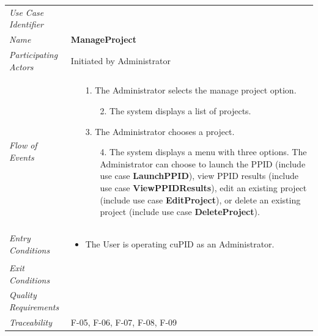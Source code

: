 \documentclass[12pt,letterpaper]{article}
\begin{document}
\begin{center}
  	  \begin{tabu} to 
		\toprule
		Use Case Identifier & \manageproject{} \\
		Name & {\bf ManageProject} \\
   	     Participating Actors & Initiated by Administrator \\
		Flow of Events & 
		\begin{minipage}[t]{\linewidth}
		    \begin{enumerate}
			    \item[1.] The Administrator selects the manage project option.
			    \begin{enumerate}
			        \item[2.] The system displays a list of projects.
				\end{enumerate}
				\item[3.] The Administrator chooses a project.
				\begin{enumerate}
				    \item[4.] The system displays a menu with three options. The Administrator can choose to launch the PPID (include use case \textbf{LaunchPPID}), view PPID results (include use case \textbf{ViewPPIDResults}), edit an existing project (include use case \textbf{EditProject}), or delete an existing project (include use case \textbf{DeleteProject}).
				\end{enumerate}
			\end{enumerate}
	    \end{minipage} \\

		Entry Conditions &
		\begin{minipage}[t]{\linewidth}
			\begin{itemize}
			    \item The User is operating cuPID as an Administrator.
	        \end{itemize}
	    \end{minipage} \\

		Exit Conditions & \\

		Quality Requirements & \\

		Traceability & F-05, F-06, F-07, F-08, F-09\\
        \toprule
    \end{tabu}
\end{center}
\end{document}
